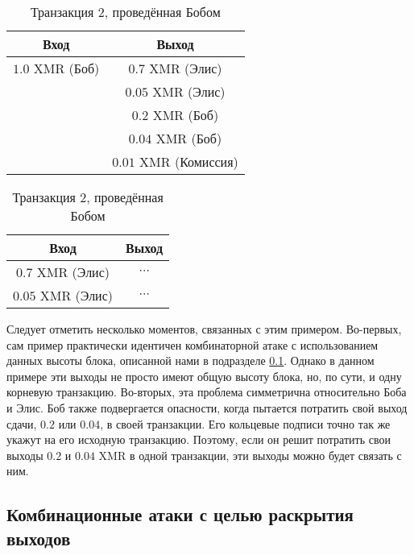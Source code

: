 \documentclass{mrl}
\begin{document}
\begin{table}[!htb]
    \caption{Связывание выходов транзакции по ассоциации}
    \label{linkByAssociation}
    \begin{subtable}{.5\linewidth}
      \centering
        \caption{Транзакция $1$, проведённая Бобом}
        \begin{tabular}{|c|c|}\hline
            Вход & Выход \\\hline
            $1.0$ XMR (Боб) & $0.7$ XMR (Элис)\\
             & $0.05$ XMR (Элис)\\
             & $0.2$ XMR (Боб)\\
             & $0.04$ XMR (Боб)\\
             & $0.01$ XMR (Комиссия)\\\hline
        \end{tabular}
    \end{subtable}%
    \begin{subtable}{.5\linewidth}
      \centering
        \caption{Транзакция $2$, проведённая Бобом}
        \begin{tabular}{|c|c|}\hline
            Вход & Выход \\\hline
            $0.7$ XMR (Элис) & $\cdots$ \\
            $0.05$ XMR (Элис) & $\cdots$ \\\hline
        \end{tabular}
    \end{subtable}%
\end{table}

Следует отметить несколько моментов, связанных с этим примером. Во-первых, сам пример практически идентичен комбинаторной атаке с использованием данных высоты блока, описанной нами в подразделе \ref{combinationAttacks}. Однако в данном примере эти выходы не просто имеют общую высоту блока, но, по сути, и одну корневую транзакцию. Во-вторых, эта проблема симметрична относительно Боба и Элис. Боб также подвергается опасности, когда пытается потратить свой выход сдачи, $0.2$ или $0.04$, в своей транзакции. Его кольцевые подписи точно так же укажут на его исходную транзакцию. Поэтому, если он решит потратить свои выходы $0.2$ и $0.04$ XMR в одной транзакции, эти выходы можно будет связать с ним.

\subsection{Комбинационные атаки с целью раскрытия выходов}\label{combinationAttacks}
\end{document}
